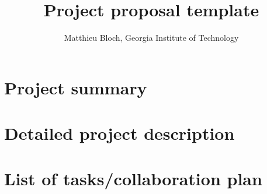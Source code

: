 \documentclass[times,12pt]{report6254}
\title{Project proposal template}
\author{Matthieu Bloch, Georgia Institute of Technology}
\begin{document}
\setlength{\abovedisplayskip}{1.5pt}
\setlength{\belowdisplayskip}{1.5pt}

\maketitle

\section*{Project summary}
\newpage

\section{Detailed project description}
\label{sec:deta-proj-descr}

\section{List of tasks/collaboration plan}
\label{sec:list-tasksc-plan}
\end{document}
